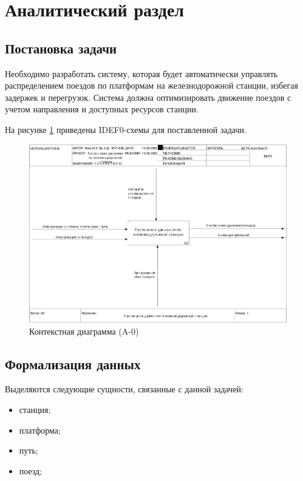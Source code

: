 \section{Аналитический раздел}

\subsection{Постановка задачи}

Необходимо разработать систему, которая будет автоматически управлять распределением поездов по платформам на железнодорожной станции, избегая задержек и перегрузок.
Система должна оптимизировать движение поездов с учетом направления и доступных ресурсов станции.

На рисунке \ref{img:A0} приведены IDEF0-схемы для поставленной задачи.
\begin{figure}[h]
	\centering
	\includegraphics[height=0.45\textheight]{img/idef0/01_A0.png}
	\caption{Контекстная диаграмма (A-0)}
	\label{img:A0}
\end{figure}
\clearpage
\subsection{Формализация данных}

Выделяются следующие сущности, связанные с данной задачей:
\begin{itemize}
	\item станция;
	\item платформа;
	\item путь;
	\item поезд;
\end{itemize}

